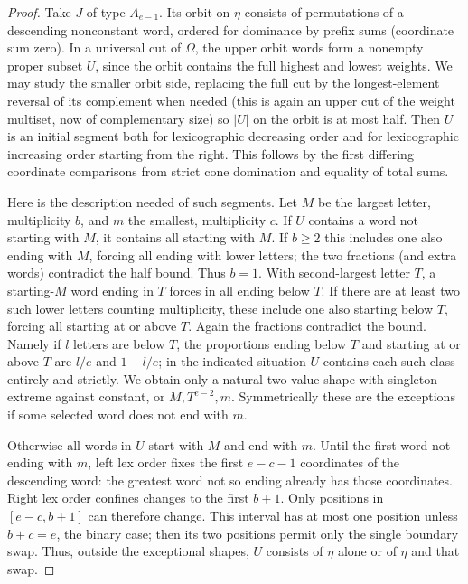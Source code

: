 \begin{proof}
Take \(J\) of type \(A_{e-1}\). Its orbit on \(\eta\) consists of permutations of a descending nonconstant word, ordered for dominance by prefix sums (coordinate sum zero). In a universal cut of \(\Omega\), the upper orbit words form a nonempty proper subset \(U\), since the orbit contains the full highest and lowest weights. We may study the smaller orbit side, replacing the full cut by the longest-element reversal of its complement when needed (this is again an upper cut of the weight multiset, now of complementary size) so \(|U|\) on the orbit is at most half. Then \(U\) is an initial segment both for lexicographic decreasing order and for lexicographic increasing order starting from the right. This follows by the first differing coordinate comparisons from strict cone domination and equality of total sums.

Here is the description needed of such segments. Let \(M\) be the largest letter, multiplicity \(b\), and \(m\) the smallest, multiplicity \(c\). If \(U\) contains a word not starting with \(M\), it contains all starting with \(M\). If \(b\ge2\) this includes one also ending with \(M\), forcing all ending with lower letters; the two fractions (and extra words) contradict the half bound. Thus \(b=1\). With second-largest letter \(T\), a starting-\(M\) word ending in \(T\) forces in all ending below \(T\). If there are at least two such lower letters counting multiplicity, these include one also starting below \(T\), forcing all starting at or above \(T\). Again the fractions contradict the bound. Namely if \(l\) letters are below \(T\), the proportions ending below \(T\) and starting at or above \(T\) are \(l/e\) and \(1-l/e\); in the indicated situation \(U\) contains each such class entirely and strictly. We obtain only a natural two-value shape with singleton extreme against constant, or \(M,T^{e-2},m\). Symmetrically these are the exceptions if some selected word does not end with \(m\).

Otherwise all words in $U$ start with $M$ and end with $m$. Until the
first word not ending with $m$, left lex order fixes the first $e-c-1$
coordinates of the descending word: the greatest word not so ending
already has those coordinates. Right lex order confines changes to
the first $b+1$. Only positions in $[e-c,b+1]$ can therefore change.
This interval has at most one position unless $b+c=e$, the binary
case; then its two positions permit only the single boundary swap.
Thus, outside the exceptional shapes, $U$ consists of $\eta$ alone or
of $\eta$ and that swap.


\end{proof}
